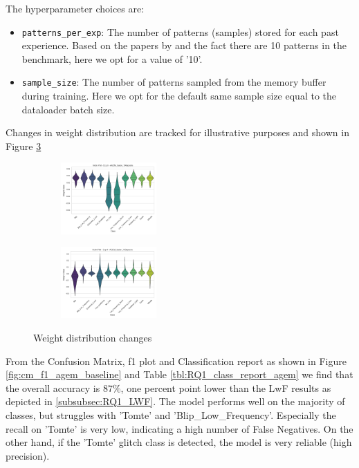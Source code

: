 The hyperparameter choices are: 
\begin{itemize}
    \item \verb|patterns_per_exp|: The number of patterns (samples) stored for each past experience. Based on the papers by \citep{chaudhry2018efficient, lopez2017gradient} and the fact there are 10 patterns in the benchmark, here we opt for a value of '10'. 
    \item \verb|sample_size|: The number of patterns sampled from the memory buffer during training. Here we opt for the default same sample size equal to the dataloader batch size. 
\end{itemize}


Changes in weight distribution are tracked for illustrative purposes and shown in Figure \ref{fig:agem_weight_distribution}

\begin{figure}[ht]
\centering
\begin{subfigure}
  \centering
  \includegraphics[width=0.4\textwidth]{Grad Assignment/Images/AGEM_fusion_100epochs_exp_0.png}  
  \label{fig:agem_violin_exp_0}
\end{subfigure}
\begin{subfigure}
  \centering
  \includegraphics[width=0.4\textwidth]{Grad Assignment/Images/AGEM_fusion_100epochs_exp_4.png}  
  \label{fig:agem_violin_exp_4}
\end{subfigure}
\caption{Weight distribution changes}
\label{fig:agem_weight_distribution}
\end{figure}

From the Confusion Matrix, f1 plot and Classification report as shown in Figure \ref{fig:cm_f1_agem_baseline} and Table \ref{tbl:RQ1_class_report_agem} we find that the overall accuracy is $87 \%$, one percent point lower than the LwF results as depicted in \ref{subsubsec:RQ1_LWF}. The model performs well on the majority of classes, but struggles with 'Tomte' and 'Blip\_Low\_Frequency'. Especially the recall on 'Tomte' is very low, indicating a high number of False Negatives. On the other hand, if the 'Tomte' glitch class is detected, the model is very reliable (high precision). 

